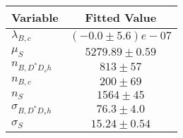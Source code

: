 \begin{tabular}[t]{lc}
\hline
Variable &Fitted Value\\
\hline\hline
$\lambda_{B,c}$&$(-0.0\pm5.6)e-07$\\
\hline
$\mu_S$&$5279.89\pm0.59$\\
\hline
$n_{B, D^* D_s h}$&$813\pm57$\\
\hline
$n_{B,c}$&$200\pm69$\\
\hline
$n_S$&$1564\pm45$\\
\hline
$\sigma_{B, D^* D_s h}$&$76.3\pm4.0$\\
\hline
$\sigma_S$&$15.24\pm0.54$\\
\hline
\end{tabular}